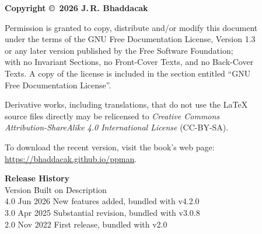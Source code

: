 \thispagestyle{empty}
{\footnotesize
\noindent\textbf{Copyright \copyright\ 2026 J.\,R. Bhaddacak}

\parskip=3mm
\noindent 
Permission is granted to copy, distribute and/or modify this document\\
under the terms of the GNU Free Documentation License, Version 1.3\\
or any later version published by the Free Software Foundation;\\
with no Invariant Sections, no Front-Cover Texts, and no Back-Cover\\
Texts.  A copy of the license is included in the section entitled ``GNU\\
Free Documentation License''.

\parskip=3mm
\noindent 
Derivative works, including translations, that do not use the \LaTeX\\
source files directly may be relicensed to \emph{Creative Commons\\
Attribution-ShareAlike 4.0 International License} (CC-BY-SA).

\parskip=3mm
\noindent 
To download the recent version, visit the book's web page:\\
\url{https://bhaddacak.github.io/ppman}.

\begin{tabbing}
\textbf{Release History}\\
Version \hspace{4mm} \= Built on \hspace{15mm} \= Description\\
4.0  Jun 2026 \> New features added, bundled with v4.2.0 \\
3.0  Apr 2025 \> Substantial revision, bundled with v3.0.8 \\
2.0  Nov 2022 \> First release, bundled with v2.0 \\
\end{tabbing}
}
